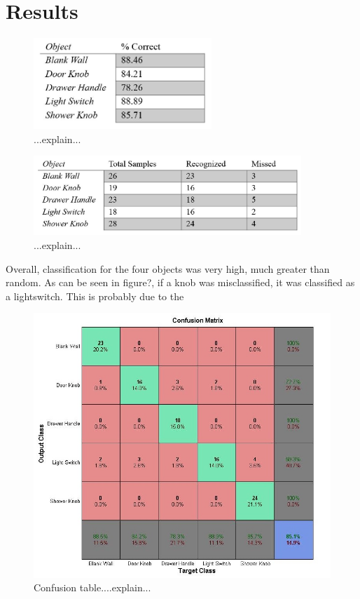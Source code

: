 \documentclass{article}
\begin{document}
\section{Results}
\begin{figure}[h!]
    \centering
    \includegraphics[width=0.6\textwidth]{Results_1.JPG}
    \caption{...explain...}
    \label{fig:results1}
\end{figure}
\begin{figure}[h!]
    \centering
    \includegraphics[width=0.9\textwidth]{Results_2.JPG}
    \caption{...explain...}
    \label{fig:results2}
\end{figure}
Overall, classification for the four objects was very high, much greater than random. As can be seen in figure?, if a knob was misclassified, it was classified as a lightswitch. This is probably due to the 

\begin{figure}[h!]
    \centering
    \includegraphics[width=.6\textwidth]{confusion.jpg}
    \caption{Confusion table....explain...}
    \label{fig:confusion}
\end{figure}
\end{document}

